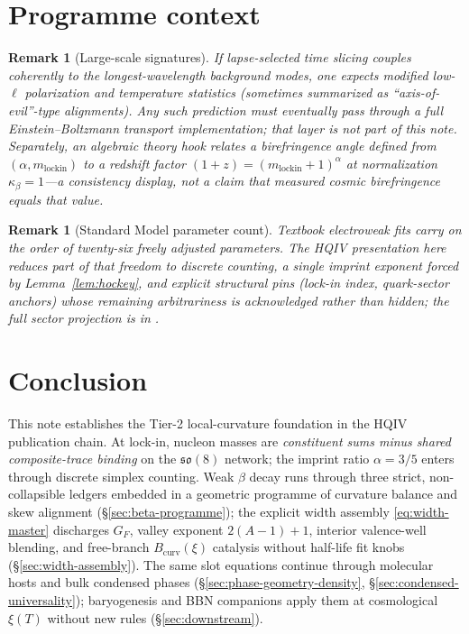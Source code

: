 \documentclass[11pt,notitlepage]{amsart}
\newtheorem{remark}[theorem]{Remark}
\begin{document}
\section{Programme context}
\label{sec:programme-context}

\begin{remark}[Large-scale signatures]
If lapse-selected time slicing couples coherently to the longest-wavelength background
modes, one expects modified low-$\ell$ polarization and temperature statistics
(sometimes summarized as ``axis-of-evil''-type alignments). Any such prediction must
eventually pass through a full Einstein--Boltzmann transport implementation; that layer
is not part of this note. Separately, an algebraic theory hook relates a birefringence
angle defined from $(\alpha,m_{\mathrm{lockin}})$ to a redshift factor
$(1+z)=(m_{\mathrm{lockin}}+1)^{\alpha}$ at normalization $\kappa_{\beta}=1$---a
consistency display, not a claim that measured cosmic birefringence equals that value.
\end{remark}

\begin{remark}[Standard Model parameter count]
Textbook electroweak fits carry on the order of twenty-six freely adjusted parameters.
The HQIV presentation here reduces part of that freedom to discrete counting, a single
imprint exponent forced by Lemma~\ref{lem:hockey}, and explicit structural pins
(lock-in index, quark-sector anchors) whose remaining arbitrariness is acknowledged
rather than hidden; the full sector projection is in
\cite{hqiv-tuft-sm-lagrangian-paper}.
\end{remark}

\section{Conclusion}
\label{sec:conclusion}

This note establishes the Tier-2 local-curvature foundation in the HQIV publication
chain. At lock-in, nucleon masses are \emph{constituent sums minus shared
composite-trace binding} on the $\mathfrak{so}(8)$ network; the imprint ratio
$\alpha=3/5$ enters through discrete simplex counting. Weak $\beta$ decay runs through
three strict, non-collapsible ledgers embedded in a geometric programme of curvature
balance and skew alignment (\S\ref{sec:beta-programme}); the explicit width assembly
\eqref{eq:width-master} discharges $G_F$, valley exponent $2(A{-}1){+}1$, interior
valence-well blending, and free-branch $B_{\mathrm{curv}}(\xi)$ catalysis without
half-life fit knobs (\S\ref{sec:width-assembly}). The same slot equations continue
through molecular hosts and bulk condensed phases
(\S\ref{sec:phase-geometry-density}, \S\ref{sec:condensed-universality}); baryogenesis
and BBN companions apply them at cosmological $\xi(T)$ without new rules
(\S\ref{sec:downstream}).
\end{document}

